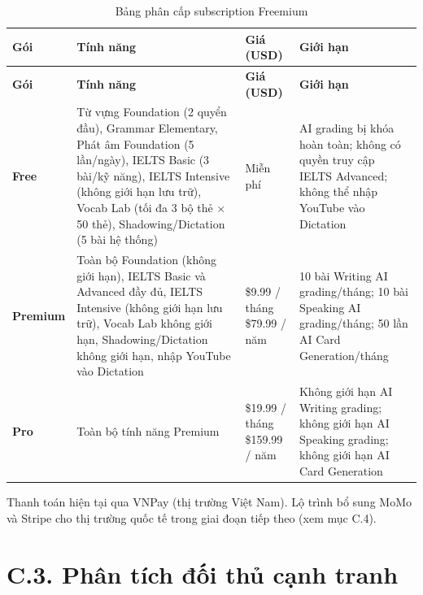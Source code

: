 \setlength{\tbu}{\dimexpr(\linewidth - 8\tabcolsep - 5\arrayrulewidth)/140\relax}
\begin{longtable}{|p{22\tbu}|p{48\tbu}|p{28\tbu}|p{42\tbu}|}
    \caption{Bảng phân cấp subscription Freemium} \label{tab:freemium} \\
    \hline
    \textbf{Gói} & \textbf{Tính năng} & \textbf{Giá (USD)} & \textbf{Giới hạn} \\ \hline
    \endfirsthead
    \hline
    \textbf{Gói} & \textbf{Tính năng} & \textbf{Giá (USD)} & \textbf{Giới hạn} \\ \hline
    \endhead
    \hline
    \endfoot
    \endlastfoot
    \textbf{Free}
      & Từ vựng Foundation (2 quyển đầu), Grammar Elementary, Phát âm Foundation (5 lần/ngày), IELTS Basic (3 bài/kỹ năng), IELTS Intensive (không giới hạn lưu trữ), Vocab Lab (tối đa 3 bộ thẻ $\times$ 50 thẻ), Shadowing/Dictation (5 bài hệ thống)
      & Miễn phí
      & AI grading bị khóa hoàn toàn; không có quyền truy cập IELTS Advanced; không thể nhập YouTube vào Dictation \\ \hline
    \textbf{Premium}
      & Toàn bộ Foundation (không giới hạn), IELTS Basic và Advanced đầy đủ, IELTS Intensive (không giới hạn lưu trữ), Vocab Lab không giới hạn, Shadowing/Dictation không giới hạn, nhập YouTube vào Dictation
      & \$9.99 / tháng \newline \$79.99 / năm
      & 10 bài Writing AI grading/tháng; 10 bài Speaking AI grading/tháng; 50 lần AI Card Generation/tháng \\ \hline
    \textbf{Pro}
      & Toàn bộ tính năng Premium
      & \$19.99 / tháng \newline \$159.99 / năm
      & Không giới hạn AI Writing grading; không giới hạn AI Speaking grading; không giới hạn AI Card Generation \\ \hline
\end{longtable}

Thanh toán hiện tại qua VNPay (thị trường Việt Nam). Lộ trình bổ sung MoMo và Stripe cho thị trường quốc tế trong giai đoạn tiếp theo (xem mục C.4).

\section*{C.3. Phân tích đối thủ cạnh tranh}

